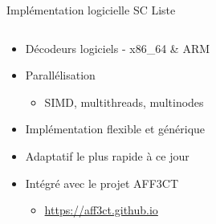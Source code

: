 \documentclass[t,compress,mathserif,12pt,xcolor=dvipsnames]{beamer}
\begin{document}
\begin{frame}[t]{Implémentation logicielle SC Liste}
  \begin{minipage}[t][5.0cm][t]{\textwidth}
    \begin{columns}[T]
      \begin{column}{0.63\textwidth}
        \begin{itemize}
          \item<+-> Décodeurs logiciels - x86\_64 \& ARM
          \item<+-> Parallélisation
          \begin{itemize}
            \item<2-> SIMD, multithreads, multinodes
          \end{itemize}
          \item<+-> Implémentation flexible et générique
          \item<+-> Adaptatif le plus rapide à ce jour
          \item<+-> Intégré avec le projet AFF3CT
          \begin{itemize}
            \item<5-> \url{https://aff3ct.github.io}
          \end{itemize}
        \end{itemize}
      \end{column}
      \begin{column}{0.04\textwidth}


\end{column}
\end{columns}
\end{minipage}
\end{frame}
\end{document}
